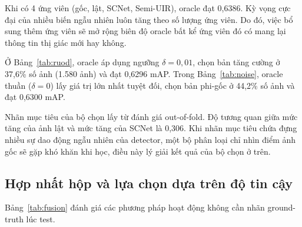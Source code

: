 \documentclass[runningheads]{llncs}
\begin{document}
Khi có 4 ứng viên (gốc, lật, SCNet, Semi-UIR), oracle đạt 0,6386. Kỳ vọng cực đại của nhiều biến ngẫu nhiên luôn tăng theo số lượng ứng viên. Do đó, việc bổ sung thêm ứng viên sẽ mở rộng biên độ oracle bất kể ứng viên đó có mang lại thông tin thị giác mới hay không.

Ở Bảng~\ref{tab:ruod}, oracle áp dụng ngưỡng $\delta = 0{,}01$, chọn bản tăng cường ở 37,6\% số ảnh (1.580 ảnh) và đạt 0,6296 mAP. Trong Bảng~\ref{tab:noise}, oracle thuần ($\delta = 0$) lấy giá trị lớn nhất tuyệt đối, chọn bản phi-gốc ở 44,2\% số ảnh và đạt 0,6300 mAP.

Nhãn mục tiêu của bộ chọn lấy từ đánh giá out-of-fold. Độ tương quan giữa mức tăng của ảnh lật và mức tăng của SCNet là 0,306. Khi nhãn mục tiêu chứa đựng nhiều sự dao động ngẫu nhiên của detector, một bộ phân loại chỉ nhìn điểm ảnh gốc sẽ gặp khó khăn khi học, điều này lý giải kết quả của bộ chọn ở trên.

\subsection{Hợp nhất hộp và lựa chọn dựa trên độ tin cậy}
\label{sec:res-fusion}

Bảng~\ref{tab:fusion} đánh giá các phương pháp hoạt động không cần nhãn ground-truth lúc test.

\begin{table}[t]
    \centering
    \caption{Hợp nhất đa góc nhìn và chọn theo độ tin cậy trên tập test RUOD.}
    \label{tab:fusion}
\end{table}
\end{document}
